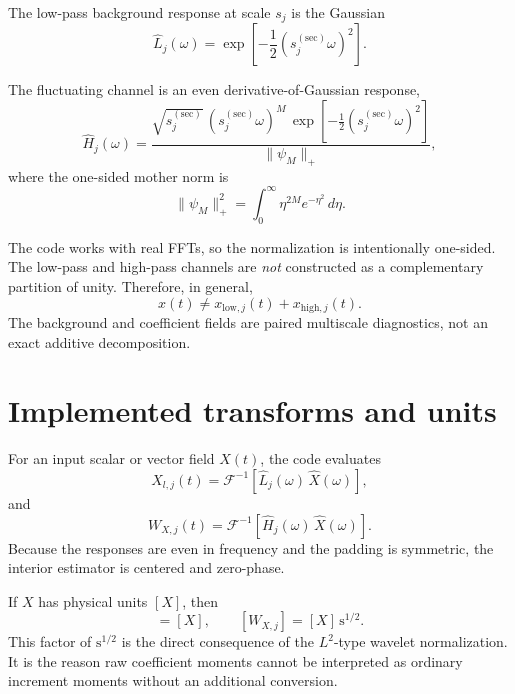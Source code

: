 \documentclass[11pt]{article}
\begin{document}
The low-pass background response at scale $s_j$ is the Gaussian
\begin{equation}
 \widehat{L}_j(\omega) = \exp\!\left[-\frac{1}{2} (s_j^{(\mathrm{sec})}\omega)^2\right].
\end{equation}

The fluctuating channel is an even derivative-of-Gaussian response,
\begin{equation}
 \widehat{H}_j(\omega) = \frac{\sqrt{s_j^{(\mathrm{sec})}}\,(s_j^{(\mathrm{sec})}\omega)^M \, \exp\!\left[-\frac{1}{2}(s_j^{(\mathrm{sec})}\omega)^2\right]}{\|\psi_M\|_+},
\end{equation}
where the one-sided mother norm is
\begin{equation}
 \|\psi_M\|_+^2 = \int_0^{\infty} \eta^{2M} e^{-\eta^2} \, d\eta.
\end{equation}

The code works with real FFTs, so the normalization is intentionally one-sided. The low-pass and high-pass channels are \emph{not} constructed as a complementary partition of unity. Therefore, in general,
\begin{equation}
 x(t) \neq x_{\mathrm{low},j}(t) + x_{\mathrm{high},j}(t).
\end{equation}
The background and coefficient fields are paired multiscale diagnostics, not an exact additive decomposition.

\section{Implemented transforms and units}

For an input scalar or vector field $X(t)$, the code evaluates
\begin{equation}
 X_{l,j}(t) = \mathcal{F}^{-1}\!\left[\widehat{L}_j(\omega) \, \widehat{X}(\omega)\right],
\end{equation}
and
\begin{equation}
 W_{X,j}(t) = \mathcal{F}^{-1}\!\left[\widehat{H}_j(\omega) \, \widehat{X}(\omega)\right].
\end{equation}
Because the responses are even in frequency and the padding is symmetric, the interior estimator is centered and zero-phase.

If $X$ has physical units $[X]$, then
\begin{equation}
 [X_{l,j}] = [X], \qquad [W_{X,j}] = [X] \, \mathrm{s}^{1/2}.
\end{equation}
This factor of $\mathrm{s}^{1/2}$ is the direct consequence of the $L^2$-type wavelet normalization. It is the reason raw coefficient moments cannot be interpreted as ordinary increment moments without an additional conversion.
\end{document}
